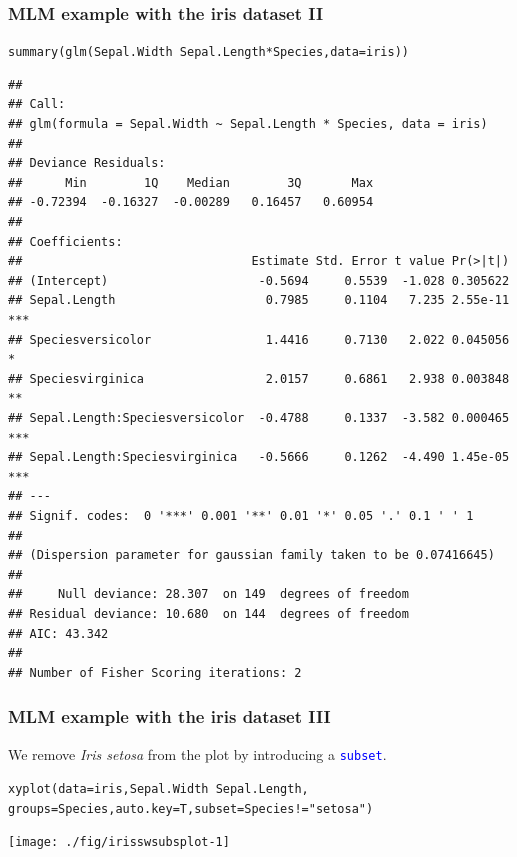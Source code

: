 \documentclass[xcolor=table, xcolor=dvipsnames]{beamer}\usepackage[]{graphicx}\usepackage[]{color}
\makeatletter
\newcommand{\hlstr}[1]{\textcolor[rgb]{0.545,0.137,0.137}{#1}}
\newcommand{\hlopt}[1]{\textcolor[rgb]{0,0,0}{#1}}
\newcommand{\hlstd}[1]{\textcolor[rgb]{0,0,0}{#1}}
\newcommand{\hlkwc}[1]{\textcolor[rgb]{1,0,1}{#1}}
\newcommand{\hlkwd}[1]{\textcolor[rgb]{0,0,1}{#1}}
\newenvironment{kframe}{%
 \def\at@end@of@kframe{}%
 \ifinner\ifhmode%
  \def\at@end@of@kframe{\end{minipage}}%
  \begin{minipage}{\columnwidth}%
 \fi\fi%
 \def\FrameCommand##1{\hskip\@totalleftmargin \hskip-\fboxsep
 \colorbox{shadecolor}{##1}\hskip-\fboxsep
     \hskip-\linewidth \hskip-\@totalleftmargin \hskip\columnwidth}%
 \MakeFramed {\advance\hsize-\width
   \@totalleftmargin\z@ \linewidth\hsize
   \@setminipage}}%
 {\par\unskip\endMakeFramed%
 \at@end@of@kframe}
\newenvironment{knitrout}{}{} %
\newcommand{\rcode}[1]{\texttt{\textcolor{Blue}{#1}}} %
\makeatother
\begin{document}

\begin{frame}[fragile]\frametitle{MLM example with the iris dataset II}

\begin{knitrout}\tiny
{}\color{fgcolor}\begin{kframe}
\begin{alltt}
\hlkwd{summary}\hlstd{(}\hlkwd{glm}\hlstd{(Sepal.Width} \hlopt{~} \hlstd{Sepal.Length} \hlopt{*} \hlstd{Species,} \hlkwc{data}\hlstd{=iris))}
\end{alltt}
\begin{verbatim}
## 
## Call:
## glm(formula = Sepal.Width ~ Sepal.Length * Species, data = iris)
## 
## Deviance Residuals: 
##      Min        1Q    Median        3Q       Max  
## -0.72394  -0.16327  -0.00289   0.16457   0.60954  
## 
## Coefficients:
##                                Estimate Std. Error t value Pr(>|t|)    
## (Intercept)                     -0.5694     0.5539  -1.028 0.305622    
## Sepal.Length                     0.7985     0.1104   7.235 2.55e-11 ***
## Speciesversicolor                1.4416     0.7130   2.022 0.045056 *  
## Speciesvirginica                 2.0157     0.6861   2.938 0.003848 ** 
## Sepal.Length:Speciesversicolor  -0.4788     0.1337  -3.582 0.000465 ***
## Sepal.Length:Speciesvirginica   -0.5666     0.1262  -4.490 1.45e-05 ***
## ---
## Signif. codes:  0 '***' 0.001 '**' 0.01 '*' 0.05 '.' 0.1 ' ' 1
## 
## (Dispersion parameter for gaussian family taken to be 0.07416645)
## 
##     Null deviance: 28.307  on 149  degrees of freedom
## Residual deviance: 10.680  on 144  degrees of freedom
## AIC: 43.342
## 
## Number of Fisher Scoring iterations: 2
\end{verbatim}
\end{kframe}
\end{knitrout}

\end{frame}


\begin{frame}[fragile]\frametitle{MLM example with the iris dataset III}
We remove \textit{Iris setosa} from the plot by introducing a \rcode{subset}.
\begin{knitrout}
\color{fgcolor}\begin{kframe}
\begin{alltt}
\hlkwd{xyplot}\hlstd{(}\hlkwc{data}\hlstd{=iris, Sepal.Width} \hlopt{~} \hlstd{Sepal.Length,}
  \hlkwc{groups}\hlstd{=Species,} \hlkwc{auto.key}\hlstd{=T,} \hlkwc{subset}\hlstd{=Species}\hlopt{!=}\hlstr{"setosa"}\hlstd{)}
\end{alltt}
\end{kframe}

{\centering \texttt{[image: ./fig/irisswsubsplot-1]} 

}



\end{knitrout}
\end{frame}
\end{document}
